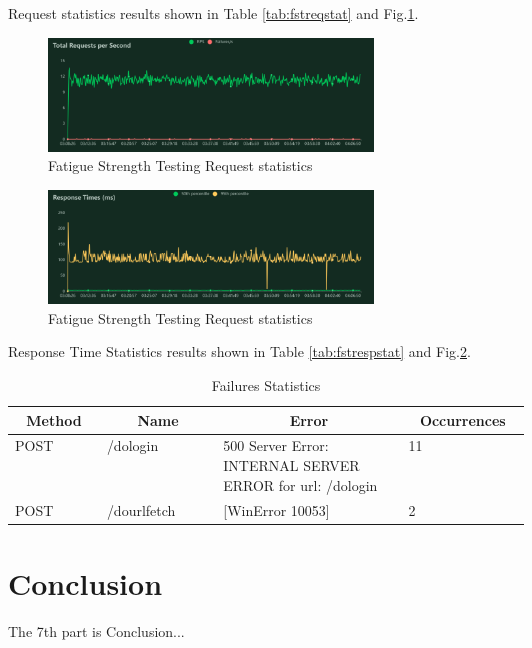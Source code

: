 \documentclass[journal]{IEEEtran}
\begin{document}
Request statistics results shown in Table \ref{tab:fstreqstat} and Fig.\ref{fig:fstreqstat}.

\begin{figure}[h]
  \centering
  \includegraphics[width=3.4in]{figures/fstreqstat.png}
  \caption{Fatigue Strength Testing Request statistics}
  \label{fig:fstreqstat}
  \end{figure}
\begin{figure}[h]
  \centering
  \includegraphics[width=3.4in]{figures/fstrespstat.png}
  \caption{Fatigue Strength Testing Request statistics}
  \label{fig:fstrespstat}
  \end{figure}

Response Time Statistics results shown in Table \ref{tab:fstrespstat} and Fig.\ref{fig:fstrespstat}.

\begin{table}[h]
\caption{Failures Statistics}
\label{tab:failureseva}
\begin{tabular}{|p{0.1\linewidth}|p{0.15\linewidth}|p{0.25\linewidth}|p{0.1\linewidth}|}
\hline
\multicolumn{1}{|c|}{\textbf{Method}} & \multicolumn{1}{c|}{\textbf{Name}} & \multicolumn{1}{c|}{\textbf{Error}}                       & \multicolumn{1}{c|}{\textbf{Occurrences}} \\ \hline
POST                                  & /dologin                           & 500 Server Error: INTERNAL SERVER ERROR for url: /dologin & 11                                        \\ \hline
POST                                  & /dourlfetch                        & {[}WinError 10053{]}                 & 2                                         \\ \hline
\end{tabular}
\end{table}

\section{Conclusion}
\noindent The 7th part is Conclusion...
\end{document}
